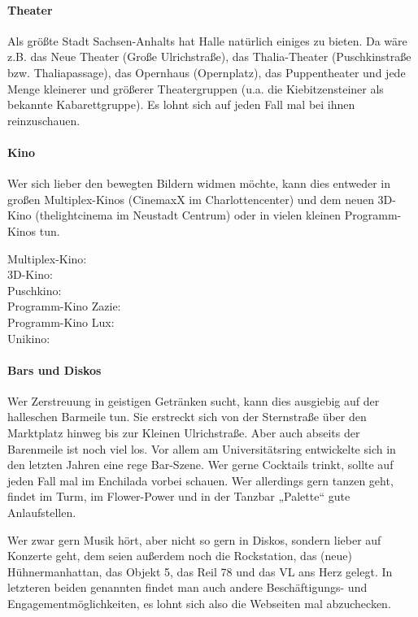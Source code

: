 \paragraph{Theater}
Als größte Stadt Sachsen-Anhalts hat Halle natürlich einiges zu bieten.
Da wäre z.B. das Neue Theater (Große Ulrichstraße), das Thalia-Theater (Puschkinstraße bzw. Thaliapassage), das Opernhaus (Opernplatz), das Puppentheater und jede Menge kleinerer und größerer Theatergruppen (\;u.a. die Kiebitzensteiner als bekannte Kabarettgruppe).
Es lohnt sich auf jeden Fall mal bei ihnen reinzuschauen.

\paragraph{Kino}
Wer sich lieber den bewegten Bildern widmen möchte, kann dies entweder in großen Multiplex-Kinos (CinemaxX im Charlottencenter) und dem neuen 3D-Kino (thelightcinema im Neustadt Centrum) oder in vielen kleinen Programm-Kinos tun.

Multiplex-Kino: \\
3D-Kino: \\
Puschkino: \\
Programm-Kino Zazie: \\
Programm-Kino Lux: \\
Unikino: 


\paragraph{Bars und Diskos}
Wer Zerstreuung in geistigen Getränken sucht, kann dies ausgiebig auf der halleschen Barmeile tun.
Sie erstreckt sich von der Sternstraße über den Marktplatz hinweg bis zur Kleinen Ulrichstraße.
Aber auch abseits der Barenmeile ist noch viel los.
Vor allem am Universitätsring entwickelte sich in den letzten Jahren eine rege Bar-Szene.
Wer gerne Cocktails trinkt, sollte auf jeden Fall mal im Enchilada vorbei schauen.
Wer allerdings gern tanzen geht, findet im Turm, im Flower-Power und in der Tanzbar „Palette“ gute Anlaufstellen.

Wer zwar gern Musik hört, aber nicht so gern in Diskos, sondern lieber auf Konzerte geht, dem seien außerdem noch die Rockstation, das (neue) Hühnermanhattan, das Objekt 5, das Reil 78 und das VL ans Herz gelegt.
In letzteren beiden genannten findet man auch andere Beschäftigungs- und Engagementmöglichkeiten, es lohnt sich also die Webseiten mal abzuchecken.

